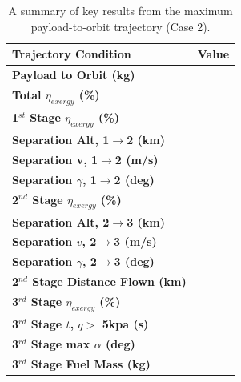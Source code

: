 \begin{table}[ht]
	\centering
\begin{tabular}{l c } 
	\hline \textbf{Trajectory Condition}
	& Value
	\\
	\hline \textbf{Payload to Orbit (kg)}
	& \textbf{\PayloadToOrbitStandardNoReturn}
	\\
	\textbf{Total $\eta_{exergy}$ (\%)}
	& \textbf{\totalExergyEffStandardNoReturn}
	\\
	\hline 
	\textbf{1$^{st}$ Stage $\eta_{exergy}$ (\%)}
	& \textbf{\firstExergyEffStandardNoReturn}
	\\

	\textbf{Separation Alt, 1$\rightarrow$2 (km)}
	& \firstsecondSeparationAltStandardNoReturn
	\\
	\textbf{Separation v, 1$\rightarrow$2 (m/s)}
	& \firstsecondSeparationvStandardNoReturn
	\\
	\textbf{Separation $\gamma$, 1$\rightarrow$2 (deg)}
	& \firstsecondSeparationgammaStandardNoReturn
	\\
	\hline 
	\textbf{2$^{nd}$ Stage $\eta_{exergy}$ (\%)}
	& \textbf{\secondExergyEffStandardNoReturn}
	\\

	\textbf{Separation Alt, 2$\rightarrow$3 (km)}
	& \secondthirdSeparationAltStandardNoReturn
	\\
	\textbf{Separation $v$, 2$\rightarrow$3 (m/s)}
	& \secondthirdSeparationvStandardNoReturn
	\\
	\textbf{Separation $\gamma$, 2$\rightarrow$3 (deg)}
	& \secondthirdSeparationgammaStandardNoReturn
	\\
	\textbf{2$^{nd}$ Stage Distance Flown (km)}
	& \SecondDistStandardNoReturn
	\\
	\hline 
	\textbf{3$^{rd}$ Stage $\eta_{exergy}$ (\%)}
	& \textbf{\thirddExergyEffStandardNoReturn}
	\\

	\textbf{3$^{rd}$ Stage $t$, $q >$ 5kpa (s)}
	& \thirdqOverFiveStandardNoReturn
	\\
	\textbf{3$^{rd}$ Stage max $\alpha$ (deg)}
	& \thirdmaxAoAStandardNoReturn
	\\
	\textbf{3$^{rd}$ Stage Fuel Mass (kg)}
	& \thirdmFuelStandardNoReturn
	\\
	\hline 
\end{tabular} 
	\caption{A summary of key results from the maximum payload-to-orbit trajectory (Case 2).}
	\label{tab:summaryStandardNoReturn}
\end{table}







